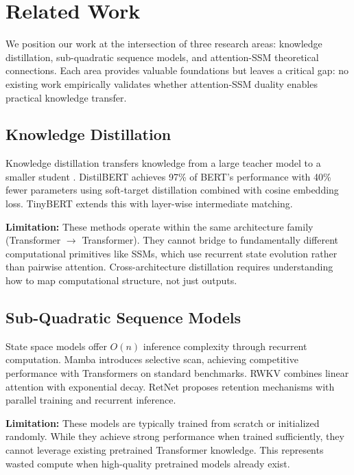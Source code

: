 \section{Related Work}
\label{sec:related_work}

We position our work at the intersection of three research areas: knowledge distillation, sub-quadratic sequence models, and attention-SSM theoretical connections. Each area provides valuable foundations but leaves a critical gap: no existing work empirically validates whether attention-SSM duality enables practical knowledge transfer.

\subsection{Knowledge Distillation}

Knowledge distillation transfers knowledge from a large teacher model to a smaller student \citep{hinton2015distilling}. DistilBERT \citep{sanh2019distilbert} achieves 97\% of BERT's performance with 40\% fewer parameters using soft-target distillation combined with cosine embedding loss. TinyBERT \citep{jiao2020tinybert} extends this with layer-wise intermediate matching.

\textbf{Limitation:} These methods operate within the same architecture family (Transformer $\rightarrow$ Transformer). They cannot bridge to fundamentally different computational primitives like SSMs, which use recurrent state evolution rather than pairwise attention. Cross-architecture distillation requires understanding how to map computational structure, not just outputs.

\subsection{Sub-Quadratic Sequence Models}

State space models offer $O(n)$ inference complexity through recurrent computation. Mamba \citep{gu2023mamba} introduces selective scan, achieving competitive performance with Transformers on standard benchmarks. RWKV \citep{peng2023rwkv} combines linear attention with exponential decay. RetNet \citep{sun2023retnet} proposes retention mechanisms with parallel training and recurrent inference.

\textbf{Limitation:} These models are typically trained from scratch or initialized randomly. While they achieve strong performance when trained sufficiently, they cannot leverage existing pretrained Transformer knowledge. This represents wasted compute when high-quality pretrained models already exist.

